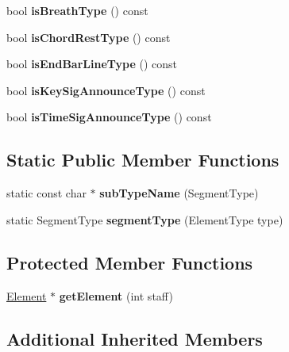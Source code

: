 \begin{DoxyCompactItemize}
bool {\bfseries is\+Breath\+Type} () const
\item 
\mbox{\label{class_ms_1_1_segment_a12875266ecd46db59c8ba3a12857c944}} 
bool {\bfseries is\+Chord\+Rest\+Type} () const
\item 
\mbox{\label{class_ms_1_1_segment_a8bc9c0ddee2937bad84e49d527476cfc}} 
bool {\bfseries is\+End\+Bar\+Line\+Type} () const
\item 
\mbox{\label{class_ms_1_1_segment_ad718781aace48b1782106f27c856aeaa}} 
bool {\bfseries is\+Key\+Sig\+Announce\+Type} () const
\item 
\mbox{\label{class_ms_1_1_segment_a6e0a5bc5828d2c2e217c3686457ff2d1}} 
bool {\bfseries is\+Time\+Sig\+Announce\+Type} () const
\end{DoxyCompactItemize}
\subsection*{Static Public Member Functions}
\begin{DoxyCompactItemize}
\item 
\mbox{\label{class_ms_1_1_segment_ad90a3cfc9d476073302c95022fdde569}} 
static const char $\ast$ {\bfseries sub\+Type\+Name} (Segment\+Type)
\item 
\mbox{\label{class_ms_1_1_segment_accf66d981db70ac1bd843ca5e03330a1}} 
static Segment\+Type {\bfseries segment\+Type} (Element\+Type type)
\end{DoxyCompactItemize}
\subsection*{Protected Member Functions}
\begin{DoxyCompactItemize}
\item 
\mbox{\label{class_ms_1_1_segment_a0f0decdac2b8174edc9d7254c745373d}} 
\hyperlink{class_ms_1_1_element}{Element} $\ast$ {\bfseries get\+Element} (int staff)
\end{DoxyCompactItemize}
\subsection*{Additional Inherited Members}


